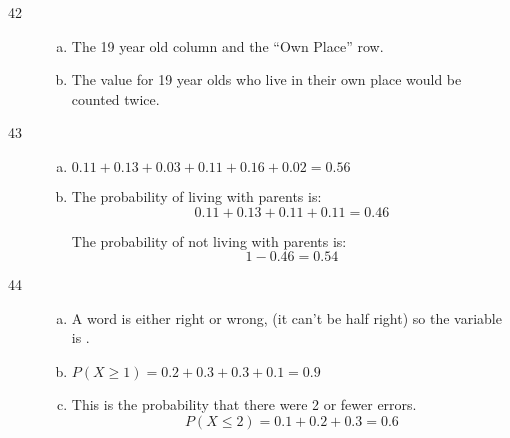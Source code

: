 \documentclass[letterpaper]{exam}
\begin{document}
\begin{description}
\begin{enumerate}[(a)]
        \end{enumerate}

      \item[42]
        \begin{enumerate}[(a)]
          \item The 19 year old column and the ``Own Place'' row.

          \item The value for 19 year olds who live in their own place would be
            counted twice.

        \end{enumerate}  

      \item[43]
        \begin{enumerate}[(a)]
          \item $0.11 + 0.13 + 0.03 + 0.11 + 0.16 + 0.02 = \boxed{ 0.56 }$

          \item The probability of living with parents is:
            \[
              0.11 + 0.13 + 0.11 + 0.11 = 0.46
            \]

            The probability of not living with parents is:
            \[
              1 - 0.46 = \boxed{ 0.54 }
            \]
        \end{enumerate}  

      \item[44]
        \begin{enumerate}[(a)]
          \item A word is either right or wrong, (it can't be half right) so the
            variable is .

          \item $P(X \geq 1) = 0.2 + 0.3 + 0.3 + 0.1 = \boxed{ 0.9 }$

          \item This is the probability that there were 2 or fewer errors.
          \[
            P(X \leq 2) = 0.1 + 0.2 + 0.3 = \boxed{ 0.6 }
          \]
        \end{enumerate}  



\end{description}
\end{document}
